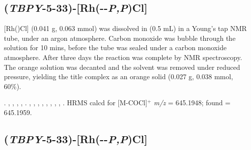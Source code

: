 
\subsection*{(\emph{TBPY}-5-33)-[Rh(\tBusixantphos--\emph{P,P}\textprime)Cl]}



[Rh(\tBusixantphos)Cl] (0.041 g, 0.063 mmol) was dissolved in  (0.5 mL) in a Young's tap NMR tube, under an argon atmosphere.  Carbon monoxide was bubble through the solution for 10 mins, before the tube was sealed under a carbon monoxide atmosphere.  After three days the reaction was complete by \phosphorus{} NMR spectroscopy.  The orange solution was decanted and the solvent was removed under reduced pressure, yielding the title complex as an orange solid (0.027 g, 0.038 mmol, 60\%). 

.
,
,
,
,
.
,
,
,
,
,
,
,
,
.
HRMS calcd for  [M-COCl]$^+$ \emph{m/z} = 645.1948; found = 645.1959.



\subsection*{(\emph{TBPY}-5-33)-[Rh(\tButhixantphos--\emph{P,P}\textprime)Cl]}


